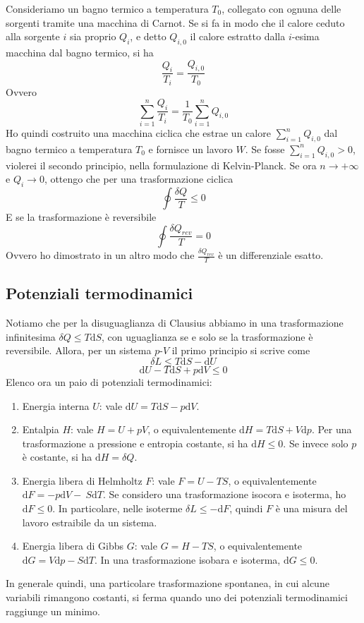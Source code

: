 \documentclass[a4paper,11pt]{article}
\begin{document}
\noindent Consideriamo un bagno termico a temperatura $T_0$, collegato con ognuna delle sorgenti tramite una macchina di Carnot. Se si fa in modo che il calore ceduto alla sorgente $i$ sia proprio $Q_i$, e detto $Q_{i,0}$ il calore estratto dalla $i$-esima macchina dal bagno termico, si ha
\[\frac{Q_i}{T_i}=\frac{Q_{i,0}}{T_0}\]
Ovvero
\[\sum_{i=1}^{n}\frac{Q_i}{T_i}=\frac{1}{T_0}\sum_{i=1}^{n}Q_{i,0}\]
Ho quindi costruito una macchina ciclica che estrae un calore $\sum_{i=1}^{n}Q_{i,0}$ dal bagno termico a temperatura $T_0$ e fornisce un lavoro $W$. Se fosse $\sum_{i=1}^{n}Q_{i,0}>0$, violerei il secondo principio, nella formulazione di Kelvin-Planck.
Se ora $n\to+\infty$ e $Q_i\to0$, ottengo che per una trasformazione ciclica
\[\oint\frac{\delta Q}{T}\leq0\]
E se la trasformazione è reversibile
\[\oint\frac{\delta Q_{rev}}{T}=0\]
Ovvero ho dimostrato in un altro modo che $\frac{\delta Q_{rev}}{T}$ è un differenziale esatto.

\subsection{Potenziali termodinamici}
Notiamo che per la disuguaglianza di Clausius abbiamo in una trasformazione infinitesima $\delta Q\leq T\mathrm{d}S$, con uguaglianza se e solo se la trasformazione è reversibile. Allora, per un sistema $p$-$V$ il primo principio si scrive come
\[\delta L\leq T\mathrm{d}S-\mathrm{d}U\]
\[\mathrm{d}U-T\mathrm{d}S+p\mathrm{d}V\leq0\]
Elenco ora un paio di potenziali termodinamici:
\begin{enumerate}
	\item Energia interna $U$: vale $\mathrm{d}U=T\mathrm{d}S-p\mathrm{d}V$.
	\item Entalpia $H$: vale $H=U+pV$, o equivalentemente $\mathrm{d}H=T\mathrm{d}S+V\mathrm{d}p$. Per una trasformazione a pressione e entropia costante, si ha $\mathrm{d}H\leq0$. Se invece solo $p$ è costante, si ha $\mathrm{d}H=\delta Q$.
	\item Energia libera di Helmholtz $F$: vale $F=U-TS$, o equivalentemente $\mathrm{d}F=-p\mathrm{d}V-~S\mathrm{d}T$. Se considero una trasformazione isocora e isoterma, ho $\mathrm{d}F\leq 0$. In particolare, nelle isoterme $\delta L\leq-\mathrm{d}F$, quindi $F$ è una misura del lavoro estraibile da un sistema.
	\item Energia libera di Gibbs $G$: vale $G=H-TS$, o equivalentemente $\mathrm{d}G=V\mathrm{d}p-S\mathrm{d}T$. In una trasformazione isobara e isoterma, $\mathrm{d}G\leq 0$.
\end{enumerate}
In generale quindi, una particolare trasformazione spontanea, in cui alcune variabili rimangono costanti, si ferma quando uno dei potenziali termodinamici raggiunge un minimo.
\end{document}
